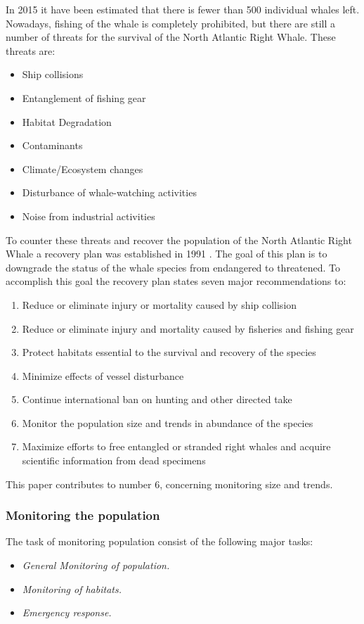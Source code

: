 In 2015 it have been estimated that there is fewer than 500 individual whales left. Nowadays, fishing of the whale is completely prohibited, but there are still a number of threats for the survival of the North Atlantic Right Whale.
These threats are:
\begin{itemize}
	\item Ship collisions 
	\item Entanglement of fishing gear
	\item Habitat Degradation 
	\item Contaminants
	\item Climate/Ecosystem changes
	\item Disturbance of whale-watching activities
	\item Noise from industrial activities
\end{itemize}
To counter these threats and recover the population of the North Atlantic Right Whale a recovery plan was established in 1991 \cite{NOAARecovery}. 
The goal of this plan is to downgrade the status of the whale species from endangered to threatened.
To accomplish this goal the recovery plan states seven major recommendations to:
\begin{enumerate}
	\item Reduce or eliminate injury or mortality caused by ship collision
	\item Reduce or eliminate injury and mortality caused by fisheries and fishing gear
	\item Protect habitats essential to the survival and recovery of the species
	\item Minimize effects of vessel disturbance
	\item Continue international ban on hunting and other directed take
	\item Monitor the population size and trends in abundance of the species
	\item Maximize efforts to free entangled or stranded right whales and acquire scientific information from dead specimens
\end{enumerate} 

This paper contributes to number 6, concerning monitoring size and trends.

\subsubsection{Monitoring the population}
The task of monitoring population consist of the following major tasks:
\begin{itemize}
\item \textit{General Monitoring of population.}
\item \textit{Monitoring of habitats.}
\item \textit{Emergency response.}
\end{itemize}

